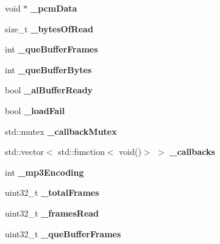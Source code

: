 \begin{DoxyCompactItemize}
void $\ast$ {\bfseries \+\_\+pcm\+Data}
\item 
\mbox{\label{classexperimental_1_1AudioCache_aae62b10e8a2f0f6966ca0c82b97f42c9}} 
size\+\_\+t {\bfseries \+\_\+bytes\+Of\+Read}
\item 
\mbox{\label{classexperimental_1_1AudioCache_a310f8d0310d62e3960d279581b0b7477}} 
int {\bfseries \+\_\+que\+Buffer\+Frames}
\item 
\mbox{\label{classexperimental_1_1AudioCache_abf714559fa9c81bd407f49a9fe1a7314}} 
int {\bfseries \+\_\+que\+Buffer\+Bytes}
\item 
\mbox{\label{classexperimental_1_1AudioCache_aab46d6250ed6b3974dd81a2740dc3947}} 
bool {\bfseries \+\_\+al\+Buffer\+Ready}
\item 
\mbox{\label{classexperimental_1_1AudioCache_a196f0a285caf18d5a144808499e606f4}} 
bool {\bfseries \+\_\+load\+Fail}
\item 
\mbox{\label{classexperimental_1_1AudioCache_a6d163e5f438c23e165d09d192f1acfb1}} 
std\+::mutex {\bfseries \+\_\+callback\+Mutex}
\item 
\mbox{\label{classexperimental_1_1AudioCache_afe43e70ab041aea5fdf691e081e22ea6}} 
std\+::vector$<$ std\+::function$<$ void()$>$ $>$ {\bfseries \+\_\+callbacks}
\item 
\mbox{\label{classexperimental_1_1AudioCache_a0a8cce8ef41bf5e3adab964bfe40a507}} 
int {\bfseries \+\_\+mp3\+Encoding}
\item 
\mbox{\label{classexperimental_1_1AudioCache_a4b8f0f7e41fe85ca948ba0484d4d4be8}} 
uint32\+\_\+t {\bfseries \+\_\+total\+Frames}
\item 
\mbox{\label{classexperimental_1_1AudioCache_af8d83c35c4471a57b8bb756254a818ce}} 
uint32\+\_\+t {\bfseries \+\_\+frames\+Read}
\item 
\mbox{\label{classexperimental_1_1AudioCache_a5af478e1d5393ef1dec907c1ddade25a}} 
uint32\+\_\+t {\bfseries \+\_\+que\+Buffer\+Frames}
\end{DoxyCompactItemize}

